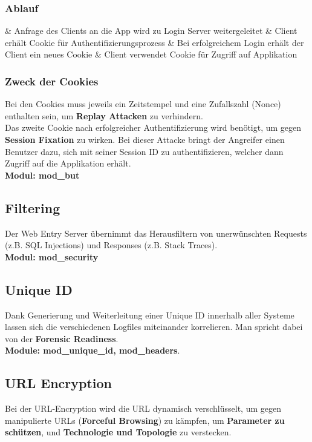 \subsubsection{Ablauf}
\begin{easylist}[enumerate]
	& Anfrage des Clients an die App wird zu Login Server weitergeleitet
	& Client erhält Cookie für Authentifizierungsprozess
	& Bei erfolgreichem Login erhält der Client ein neues Cookie
	& Client verwendet Cookie für Zugriff auf Applikation
\end{easylist}

\subsubsection{Zweck der Cookies}
Bei den Cookies muss jeweils ein Zeitstempel und eine Zufallszahl (Nonce) enthalten sein, um \textbf{Replay Attacken} zu verhindern.\\

Das zweite Cookie nach erfolgreicher Authentifizierung wird benötigt, um gegen \textbf{Session Fixation} zu wirken. Bei dieser Attacke bringt der Angreifer einen Benutzer dazu, sich mit seiner Session ID zu authentifizieren, welcher dann Zugriff auf die Applikation erhält.\\
\textbf{Modul: mod\_but}

\subsection{Filtering}
Der Web Entry Server übernimmt das Herausfiltern von unerwünschten Requests (z.B. SQL Injections) und Responses (z.B. Stack Traces).\\
\textbf{Modul: mod\_security}

\subsection{Unique ID}
Dank Generierung und Weiterleitung einer Unique ID innerhalb aller Systeme lassen sich die verschiedenen Logfiles miteinander korrelieren. Man spricht dabei von der \textbf{Forensic Readiness}.\\
\textbf{Module: mod\_unique\_id, mod\_headers}.

\subsection{URL Encryption}
Bei der URL-Encryption wird die URL dynamisch verschlüsselt, um gegen manipulierte URLs (\textbf{Forceful Browsing}) zu kämpfen, um \textbf{Parameter zu schützen}, und \textbf{Technologie und Topologie} zu verstecken.

